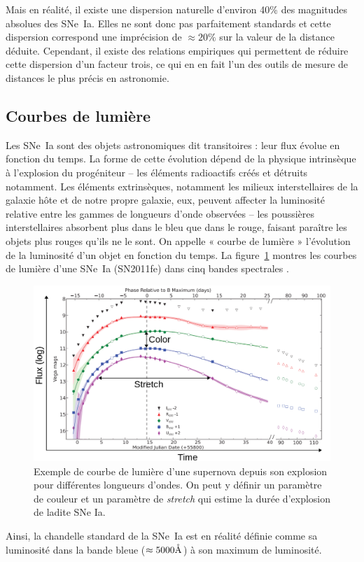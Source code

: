 \documentclass[a4paper, 12pt, svgnames]{article}
\begin{document}
Mais en réalité, il existe une dispersion naturelle d'environ 40\% des
magnitudes absolues des SNe~Ia. Elles ne sont donc pas parfaitement standards et
cette dispersion correspond une imprécision de $\approx 20\%$ sur la valeur de
la distance déduite. Cependant, il existe des relations empiriques qui
permettent de réduire cette dispersion d'un facteur trois, ce qui en en fait
l'un des outils de mesure de distances le plus précis en astronomie.

\subsection{Courbes de lumière}\label{ssec:lc}

Les SNe~Ia sont des objets astronomiques dit transitoires : leur flux évolue en
fonction du temps. La forme de cette évolution dépend de la physique intrinsèque
à l'explosion du progéniteur -- les éléments radioactifs créés et détruits
notamment. Les éléments extrinsèques, notamment les milieux interstellaires de
la galaxie hôte et de notre propre galaxie, eux, peuvent affecter la luminosité
relative entre les gammes de longueurs d'onde observées -- les poussières
interstellaires absorbent plus dans le bleu que dans le rouge, faisant paraître
les objets plus rouges qu'ils ne le sont. On appelle « courbe de lumière »
l'évolution de la luminosité d'un objet en fonction du temps. La
figure~\ref{fig:lightcurves} montres les courbes de lumière d'une SNe~Ia
(SN2011fe) dans cinq bandes spectrales \cite{pereira_spectrophotometric_2013}.

\begin{figure}[htbp!]
    \centering
    \includegraphics[width=.5\linewidth]{Rapport_figures/lightcurve.png}
    \captionsetup{justification=centering}
    \caption{Exemple de courbe de lumière d'une supernova depuis son explosion
    pour différentes longueurs d'ondes. On peut y définir un paramètre de
couleur et un paramètre de \textit{stretch} qui estime la durée d'explosion de
ladite SNe Ia.}
    \label{fig:lightcurves}
\end{figure}

Ainsi, la chandelle standard de la SNe~Ia est en réalité définie comme sa
luminosité dans la bande bleue ($\approx5000\mathring{\mathrm{A}}$) à son maximum de luminosité.
\end{document}
